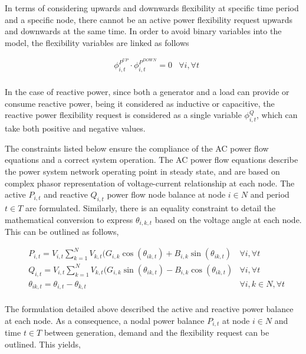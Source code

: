In terms of considering upwards and downwards flexibility at specific time period and a specific node, there cannot be an active power flexibility request upwards and downwards at the same time. In order to avoid binary variables into the model, the flexibility variables are linked as follows

\begin{subequations}
\begin{align*}
& \phi_{i,t}^{P^{UP}} \cdot \phi_{i,t}^{P^{DOWN}} = 0 & \forall i,\forall t \\
\end{align*}
\end{subequations}

In the case of reactive power, since both a generator and a load can provide or consume reactive power, being it considered as inductive or capacitive, the reactive power flexibility request is considered as a single variable $\phi_{i,t}^{Q}$, which can take both positive and negative values. 


The constraints listed below ensure the compliance of the AC power flow equations and a correct system operation. The AC power flow equations describe the power system network operating point in steady state, and are based on complex phasor representation of voltage-current relationship at each node. The active $P_{i,t}$ and reactive $Q_{i,t}$ power flow node balance at node $i \in N$ and period  $t \in T$ are formulated. Similarly, there is an equality constraint to detail the mathematical conversion to express  $\theta_{i,k,t}$ based on the voltage angle at each node. This can be outlined as follows, 

\begin{subequations}
\begin{align*}
& P_{i,t} = V_{i,t} \sum_{k=1}^{N} V_{k,t} (G_{i,k} \cos(\theta_{ik,t}) + B_{i,k} \sin(\theta_{ik,t}) & \forall i,\forall t  \\ 
& Q_{i,t} = V_{i,t} \sum_{k=1}^{N} V_{k,t} (G_{i,k} \sin(\theta_{ik,t}) - B_{i,k} \cos(\theta_{ik,t}) & \forall i,\forall t \\
& \theta_{ik,t} = \theta_{i,t} - \theta_{k,t} 															& \forall i,k \in N, \forall t \\
\end{align*}
\end{subequations}

The formulation detailed above described the active and reactive power balance at each node. As a consequence, a nodal power balance $P_{i,t}$ at node $i \in N$ and time $t \in T$ between generation, demand and the flexibility request can be outlined. This yields, 

